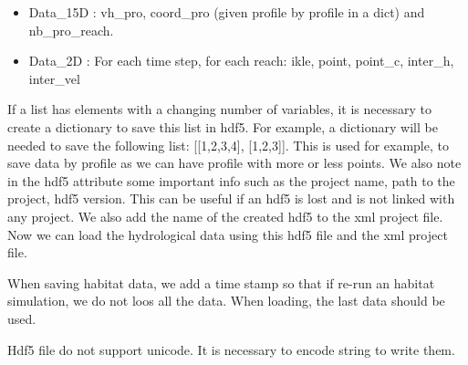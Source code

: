 \documentclass[letterpaper,10pt,english]{sphinxmanual}
\begin{document}
\begin{fulllineitems}
\begin{itemize}
\begin{itemize}
\item {} 
Data\_15D :  vh\_pro, coord\_pro (given profile by profile in a dict) and nb\_pro\_reach.

\item {} 
Data\_2D : For each time step, for each reach: ikle, point, point\_c, inter\_h, inter\_vel

\end{itemize}

\end{itemize}

If a list has elements with a changing number of variables, it is necessary to create a dictionary to save
this list in hdf5. For example, a dictionary will be needed to save the following list: {[}{[}1,2,3,4{]}, {[}1,2,3{]}{]}.
This is used for example, to save data by profile as we can have profile with more or less points. We also note
in the hdf5 attribute some important info such as the project name, path to the project, hdf5 version.
This can be useful if an hdf5 is lost and is not linked with any project. We also add the name of the created
hdf5 to the xml project file. Now we can load the hydrological data using this hdf5 file and the xml project file.

When saving habitat data, we add a time stamp so that if re-run an habitat simulation, we do not loos all the data.
When loading, the last data should be used.

Hdf5 file do not support unicode. It is necessary to encode string to write them.

\end{fulllineitems}

\end{document}
